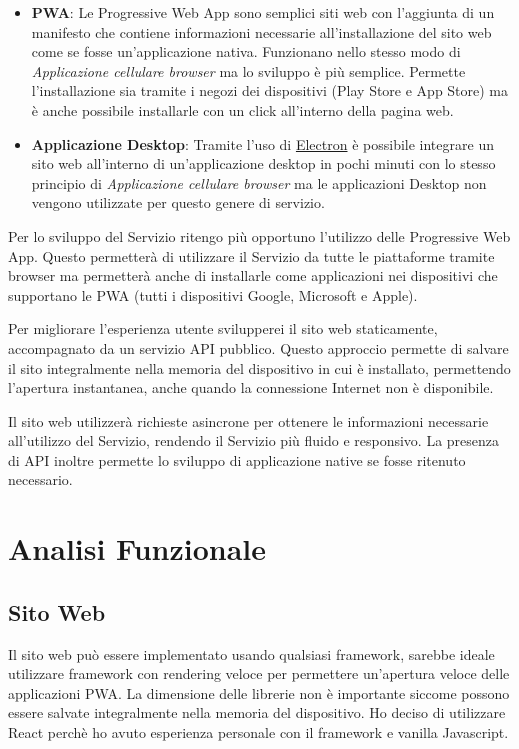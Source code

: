 \begin{itemize}
    \item \textbf{PWA}: Le Progressive Web App sono semplici siti web con l'aggiunta di un manifesto che contiene informazioni necessarie all'installazione del sito web come se fosse un'applicazione nativa. Funzionano nello stesso modo di \textit{Applicazione cellulare browser} ma lo sviluppo \`e pi\`u semplice. Permette l'installazione sia tramite i negozi dei dispositivi (Play Store e App Store) ma \`e anche possibile installarle con un click all'interno della pagina web.
    \item \textbf{Applicazione Desktop}: Tramite l'uso di \href{https://www.electronjs.org/}{Electron} \`e possibile integrare un sito web all'interno di un'applicazione desktop in pochi minuti con lo stesso principio di \textit{Applicazione cellulare browser} ma le applicazioni Desktop non vengono utilizzate per questo genere di servizio.
\end{itemize}

Per lo sviluppo del Servizio ritengo pi\`u opportuno l'utilizzo delle Progressive Web App. Questo permetter\`a di utilizzare il Servizio da tutte le piattaforme tramite browser ma permetter\`a anche di installarle come applicazioni nei dispositivi che supportano le PWA (tutti i dispositivi Google, Microsoft e Apple).

Per migliorare l'esperienza utente svilupperei il sito web staticamente, accompagnato da un servizio API pubblico. Questo approccio permette di salvare il sito integralmente nella memoria del dispositivo in cui \`e installato, permettendo l'apertura instantanea, anche quando la connessione Internet non \`e disponibile.

Il sito web utilizzer\`a richieste asincrone per ottenere le informazioni necessarie all'utilizzo del Servizio, rendendo il Servizio pi\`u fluido e responsivo. La presenza di API inoltre permette lo sviluppo di applicazione native se fosse ritenuto necessario.

\section{Analisi Funzionale}%
\label{sec:analisi_funzionale}

\subsection{Sito Web}%
\label{sub:sito_web}

Il sito web pu\`o essere implementato usando qualsiasi framework, sarebbe ideale utilizzare framework con rendering veloce per permettere un'apertura veloce delle applicazioni PWA. La dimensione delle librerie non \`e importante siccome possono essere salvate integralmente nella memoria del dispositivo. Ho deciso di utilizzare React perch\`e ho avuto esperienza personale con il framework e vanilla Javascript.

